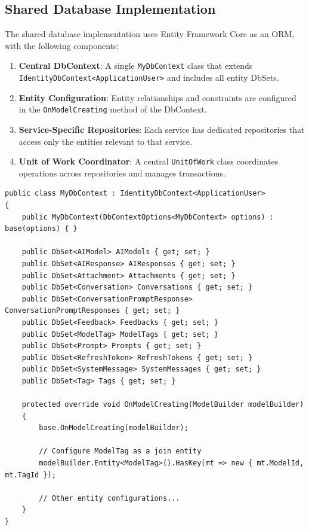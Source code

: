 \subsection{Shared Database Implementation}

The shared database implementation uses Entity Framework Core as an ORM, with the following components:

\begin{enumerate}
   \item \textbf{Central DbContext}: A single \texttt{MyDbContext} class that extends \texttt{IdentityDbContext<ApplicationUser>} and includes all entity DbSets.

   \item \textbf{Entity Configuration}: Entity relationships and constraints are configured in the \texttt{OnModelCreating} method of the DbContext.

   \item \textbf{Service-Specific Repositories}: Each service has dedicated repositories that access only the entities relevant to that service.

   \item \textbf{Unit of Work Coordinator}: A central \texttt{UnitOfWork} class coordinates operations across repositories and manages transactions.
\end{enumerate}

\begin{verbatim}
public class MyDbContext : IdentityDbContext<ApplicationUser>
{
    public MyDbContext(DbContextOptions<MyDbContext> options) : base(options) { }

    public DbSet<AIModel> AIModels { get; set; }
    public DbSet<AIResponse> AIResponses { get; set; }
    public DbSet<Attachment> Attachments { get; set; }
    public DbSet<Conversation> Conversations { get; set; }
    public DbSet<ConversationPromptResponse> ConversationPromptResponses { get; set; }
    public DbSet<Feedback> Feedbacks { get; set; }
    public DbSet<ModelTag> ModelTags { get; set; }
    public DbSet<Prompt> Prompts { get; set; }
    public DbSet<RefreshToken> RefreshTokens { get; set; }
    public DbSet<SystemMessage> SystemMessages { get; set; }
    public DbSet<Tag> Tags { get; set; }

    protected override void OnModelCreating(ModelBuilder modelBuilder)
    {
        base.OnModelCreating(modelBuilder);

        // Configure ModelTag as a join entity
        modelBuilder.Entity<ModelTag>().HasKey(mt => new { mt.ModelId, mt.TagId });

        // Other entity configurations...
    }
}
\end{verbatim}

